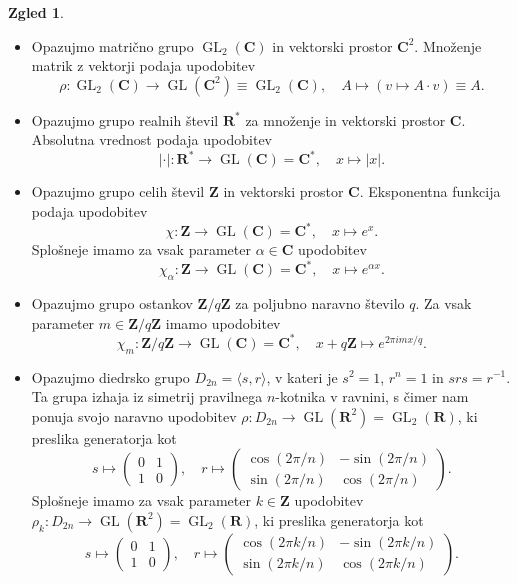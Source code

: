 \documentclass[11pt]{book}
\def\ZZ{\mathbf{Z}}
\def\RR{\mathbf{R}}
\def\CC{\mathbf{C}}
\DeclareMathOperator\GL{GL}
\theoremstyle{definition}
\theoremstyle{zgled}
\newtheorem{zgled}[theorem]{Zgled}
\theoremstyle{zgledbrezstevilke}
\theoremstyle{odprtproblem}
\theoremstyle{domacanaloga}
\theoremstyle{izrek}
\begin{document}
\begin{zgled} \leavevmode
    \begin{itemize}
        \item Opazujmo matrično grupo $\GL_2(\CC)$ in vektorski prostor $\CC^2$. Množenje matrik z vektorji podaja upodobitev
        \[
            \textstyle \rho \colon \GL_2(\CC) \to \GL(\CC^2) \equiv \GL_2(\CC), \quad
            A \mapsto \left( v \mapsto A \cdot v \right) \equiv A.
        \]

        \item Opazujmo grupo realnih števil $\RR^*$ za množenje in vektorski prostor $\CC$. Absolutna vrednost podaja upodobitev
        \[
            |\cdot| \colon \RR^* \to \GL(\CC) = \CC^*, \quad
            x \mapsto |x|.
        \]
        \item Opazujmo grupo celih števil $\ZZ$ in vektorski prostor $\CC$. Eksponentna funkcija podaja upodobitev
        \[
            \chi \colon \ZZ \to \GL(\CC) = \CC^*, \quad
            x \mapsto e^x.
        \]
        Splošneje imamo za vsak parameter $\alpha \in \CC$ upodobitev
        \[
            \chi_{\alpha} \colon \ZZ \to \GL(\CC) = \CC^*, \quad
            x \mapsto e^{\alpha x}.
        \] 
        \item Opazujmo grupo ostankov $\ZZ/q\ZZ$ za poljubno naravno število $q$. Za vsak parameter $m \in \ZZ/q\ZZ$ imamo upodobitev
        \[
            \chi_m \colon \ZZ/q\ZZ \to \GL(\CC) = \CC^*, \quad
            x + q\ZZ \mapsto e^{2 \pi i mx/q}.
        \]
        
        \item Opazujmo diedrsko grupo $D_{2n} = \langle s, r \rangle$, v kateri je $s^2 = 1$, $r^n = 1$ in $s r s = r^{-1}$. Ta grupa izhaja iz simetrij pravilnega $n$-kotnika v ravnini, s čimer nam ponuja svojo naravno upodobitev $\rho \colon D_{2n} \to \GL(\RR^2) = \GL_2(\RR)$, ki preslika generatorja kot
        \[
            s \mapsto \begin{pmatrix}
                0 & 1 \\ 1 & 0
            \end{pmatrix}, \quad
            r \mapsto \begin{pmatrix}
                \cos(2 \pi/n) & - \sin(2 \pi/n) \\
                \sin(2 \pi/n) & \cos(2 \pi/n)
            \end{pmatrix}.
        \]
        Splošneje imamo za vsak parameter $k \in \ZZ$ upodobitev $\rho_k \colon D_{2n} \to \GL(\RR^2) = \GL_2(\RR)$, ki preslika generatorja kot
        \[
            s \mapsto \begin{pmatrix}
                0 & 1 \\ 1 & 0
            \end{pmatrix}, \quad
            r \mapsto \begin{pmatrix}
                \cos(2 \pi k/n) & - \sin(2 \pi k/n) \\
                \sin(2 \pi k/n) & \cos(2 \pi k/n)
            \end{pmatrix}.
        \]
        

\end{itemize}
\end{zgled}
\end{document}
